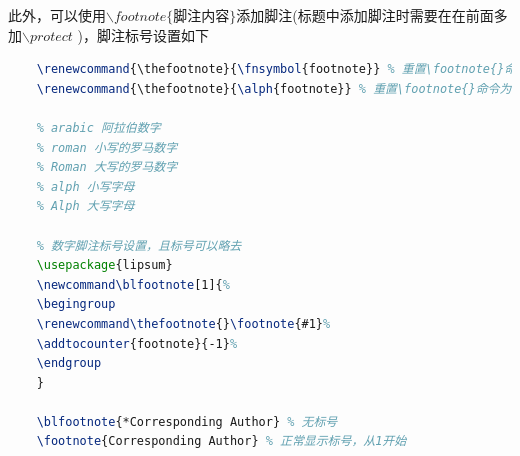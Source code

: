 此外，可以使用$\backslash footnote \{脚注内容\}$添加脚注(标题中添加脚注时需要在在前面多加$\backslash protect$ )，脚注标号设置如下
\begin{lstlisting}[language={TeX}]
    % 符号/字母 脚注标号设置
    \renewcommand{\thefootnote}{\fnsymbol{footnote}} % 重置\footnote{}命令为符号脚注
    \renewcommand{\thefootnote}{\alph{footnote}} % 重置\footnote{}命令为符号脚注
    
    % arabic 阿拉伯数字 
    % roman 小写的罗马数字 
    % Roman 大写的罗马数字 
    % alph 小写字母 
    % Alph 大写字母
    
    % 数字脚注标号设置，且标号可以略去
    \usepackage{lipsum}
    \newcommand\blfootnote[1]{% 
    \begingroup 
    \renewcommand\thefootnote{}\footnote{#1}% 
    \addtocounter{footnote}{-1}% 
    \endgroup 
    }
    
    \blfootnote{*Corresponding Author} % 无标号
    \footnote{Corresponding Author} % 正常显示标号，从1开始
\end{lstlisting}


